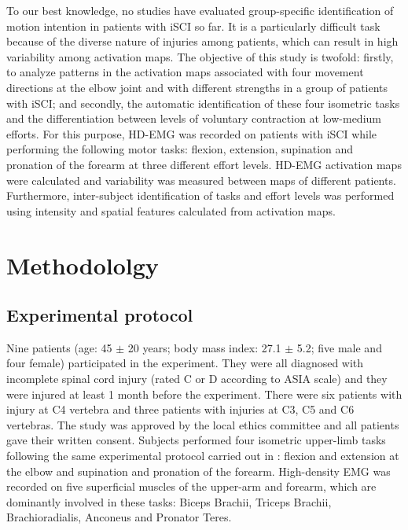 To our best knowledge, no studies have evaluated group-specific identification of motion intention in patients with iSCI so far. It is a particularly difficult task because of the diverse nature of injuries among patients, which can result in high variability among activation maps. The objective of this study is twofold: firstly, to analyze patterns in the activation maps associated with four movement directions at the elbow joint and with different strengths in a group of patients with iSCI; and secondly, the automatic identification of these four isometric tasks and the differentiation between levels of voluntary contraction at low-medium efforts. For this purpose, HD-EMG was recorded on patients with iSCI while performing the following motor tasks: flexion, extension, supination and pronation of the forearm at three different effort levels. HD-EMG activation maps were calculated and variability was measured between maps of different patients. Furthermore, inter-subject identification of tasks and effort levels was performed using intensity and spatial features calculated from activation maps. 
\\
\clearpage

\section{Methodololgy}

\subsection{Experimental protocol}

Nine patients (age: 45 $\pm$ 20 years; body mass index: 27.1 $\pm$ 5.2; five male and four female) participated in the experiment. 
They were all diagnosed with incomplete spinal cord injury (rated C or D according to ASIA scale) and they were injured at least 1 month before the experiment. There were six patients with injury at C4 vertebra and three patients with injuries at C3, C5 and C6 vertebras. The study was approved by the local ethics committee and all patients gave their written consent.
Subjects performed four isometric upper-limb tasks following the same experimental protocol carried out in \citep{Rojas-Martinez2013}: flexion and extension at the elbow and supination and pronation of the forearm. High-density EMG was recorded on five superficial muscles of the upper-arm and forearm, which are dominantly involved in these tasks: Biceps Brachii, Triceps Brachii, Brachioradialis, Anconeus and Pronator Teres.

